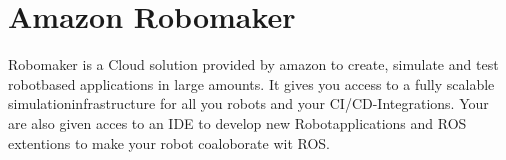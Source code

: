 \section{Amazon Robomaker}
Robomaker is a Cloud solution provided by amazon to create, simulate and test robotbased applications in large amounts. It gives you access to a fully scalable simulationinfrastructure for all you robots and your CI/CD-Integrations. Your are also given acces to an IDE to develop new Robotapplications and ROS extentions to make your robot coaloborate wit ROS.